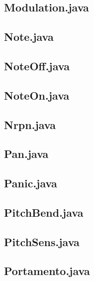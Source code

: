 \subsection{ Modulation.java }

\subsection{ Note.java }

\subsection{ NoteOff.java }

\subsection{ NoteOn.java }

\subsection{ Nrpn.java }

\subsection{ Pan.java }

\subsection{ Panic.java }

\subsection{ PitchBend.java }

\subsection{ PitchSens.java }

\subsection{ Portamento.java }

